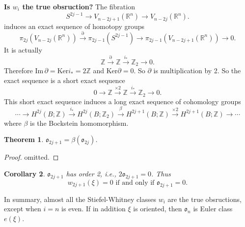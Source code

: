 \documentclass[12pt,a4paper]{article}
\newtheorem{theorem}{\indent Theorem}%
\newtheorem{corollary}[theorem]{\indent Corollary}
\theoremstyle{definition}
\newcommand{\mZ}{\mathbb{Z}}
\newcommand{\mR}{\mathbb{R}}
\newcommand{\Ker}{\mathrm{Ker}}
\newcommand{\p}{\partial}
\begin{document}
\noindent\textbf{Is $w_i$ the true obsruction?}
The fibration 
\begin{equation*}
    S^{2j-1}\to V_{n-2j+1}(\mR^n)\to V_{n-2j}(\mR^n).
\end{equation*}
induces an exact sequence of homotopy groups
\begin{equation*}
    \pi_{2j}(V_{n-2j}(\mR^n)) \xrightarrow{\partial} 
    \pi_{2j-1}(S^{2j-1})\to \pi_{2j-1} (V_{n-2j+1}(\mR^n)) \to 0.
\end{equation*}
It is actually 
\begin{equation*}
    \mZ \xrightarrow{\p} \mZ \xrightarrow{i_*} \mZ_2 \to 0.
\end{equation*}
Therefore $\mathrm{Im}\,\p=\Ker i_* = 2\mZ$ and $\Ker\p = 0$. So $\p$ is
multiplication by 2. So the exact sequence is a short exact sequence
\begin{equation*}
    0\to \mZ \xrightarrow{\times 2} \mZ \xrightarrow{i_*} \mZ_2 \to 0.
\end{equation*}
This short exact sequence induces a long exact sequence of cohomology groups
\begin{equation*}
    \cdots \to H^{2j}(B;\mZ) 
    \xrightarrow{i_*} H^{2j}(B;\mZ_2) \xrightarrow{\beta} H^{2j+1}(B;\mZ) 
    \xrightarrow{\times 2} H^{2j+1}(B;\mZ) \to \cdots
\end{equation*}
where $\beta$ is the Bockstein homomorphism.
\begin{theorem}
    $\mathfrak{o}_{2j+1} = \beta(\mathfrak{o}_{2j})$.
\end{theorem}
\begin{proof}
    omitted.
\end{proof}
\begin{corollary}
    $\mathfrak{o}_{2j+1}$ has order 2, i.e., 
    $2\mathfrak{o}_{2j+1} = 0$. Thus 
    \begin{equation*}
        w_{2j+1}(\xi) = 0 \text{ if and only if } 
        \mathfrak{o}_{2j+1} = 0.
    \end{equation*}
\end{corollary}
In summary, almost all the Stiefel-Whitney classes $w_i$ are the true 
obsructions, except when $i=n$ is even. If in addition $\xi$ is oriented, 
then $\mathfrak{o}_n$ is Euler class $e(\xi)$.

% 
\end{document}
